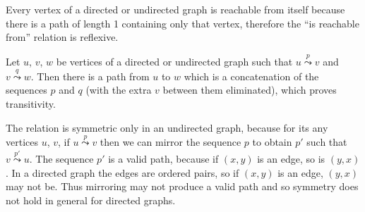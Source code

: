Every vertex of a directed or undirected graph is reachable from itself because there is a path of length 1 containing only that vertex, therefore the ``is reachable from'' relation is reflexive.

Let $u$, $v$, $w$ be vertices of a directed or undirected graph such that $u\overset{p}{\leadsto}v$ and $v\overset{q}{\leadsto}w$.
Then there is a path from $u$ to $w$ which is a concatenation of the sequences $p$ and $q$ (with the extra $v$ between them eliminated), which proves transitivity.

The relation is symmetric only in an undirected graph, because for its any vertices $u$, $v$, if $u\overset{p}{\leadsto}v$ then we can mirror the sequence $p$ to obtain $p'$ such that $v\overset{p'}{\leadsto}u$.
The sequence $p'$ is a valid path, because if $(x,y)$ is an edge, so is $(y,x)$.
In a directed graph the edges are ordered pairs, so if $(x,y)$ is an edge, $(y,x)$ may not be.
Thus mirroring may not produce a valid path and so symmetry does not hold in general for directed graphs.

